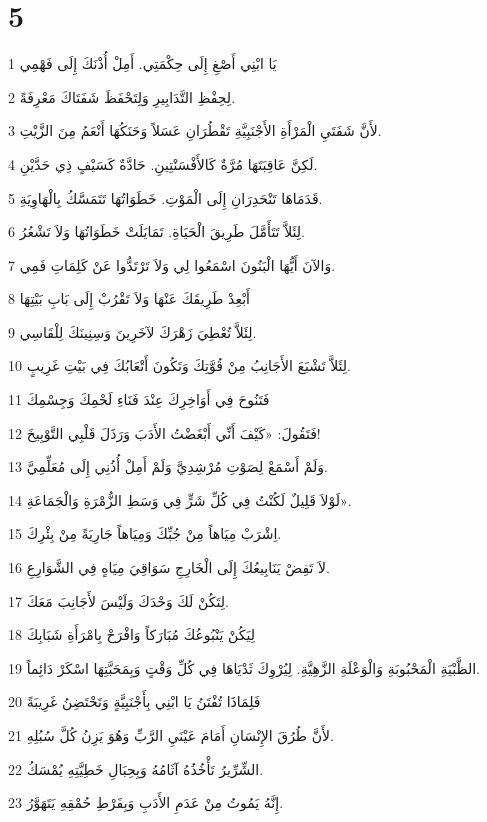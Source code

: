 \chapter{5}

\par 1 يَا ابْنِي أَصْغِ إِلَى حِكْمَتِي. أَمِلْ أُذْنَكَ إِلَى فَهْمِي
\par 2 لِحِفْظِ التَّدَابِيرِ وَلِتَحْفَظَ شَفَتَاكَ مَعْرِفَةً.
\par 3 لأَنَّ شَفَتَيِ الْمَرْأَةِ الأَجْنَبِيَّةِ تَقْطُرَانِ عَسَلاً وَحَنَكُهَا أَنْعَمُ مِنَ الزَّيْتِ.
\par 4 لَكِنَّ عَاقِبَتَهَا مُرَّةٌ كَالأَفْسَنْتِينِ. حَادَّةٌ كَسَيْفٍ ذِي حَدَّيْنِ.
\par 5 قَدَمَاهَا تَنْحَدِرَانِ إِلَى الْمَوْتِ. خَطَوَاتُهَا تَتَمَسَّكُ بِالْهَاوِيَةِ.
\par 6 لِئَلاَّ تَتَأَمَّلَ طَرِيقَ الْحَيَاةِ. تَمَايَلَتْ خَطَوَاتُهَا وَلاَ تَشْعُرُ.
\par 7 وَالآنَ أَيُّهَا الْبَنُونَ اسْمَعُوا لِي وَلاَ تَرْتَدُّوا عَنْ كَلِمَاتِ فَمِي.
\par 8 أَبْعِدْ طَرِيقَكَ عَنْهَا وَلاَ تَقْرُبْ إِلَى بَابِ بَيْتِهَا
\par 9 لِئَلاَّ تُعْطِيَ زَهْرَكَ لآخَرِينَ وَسِنِينَكَ لِلْقَاسِي.
\par 10 لِئَلاَّ تَشْبَعَ الأَجَانِبُ مِنْ قُوَّتِكَ وَتَكُونَ أَتْعَابُكَ فِي بَيْتِ غَرِيبٍ.
\par 11 فَتَنُوحَ فِي أَوَاخِرِكَ عِنْدَ فَنَاءِ لَحْمِكَ وَجِسْمِكَ
\par 12 فَتَقُولَ: «كَيْفَ أَنِّي أَبْغَضْتُ الأَدَبَ وَرَذَلَ قَلْبِي التَّوْبِيخَ!
\par 13 وَلَمْ أَسْمَعْ لِصَوْتِ مُرْشِدِيَّ وَلَمْ أَمِلْ أُذُنِي إِلَى مُعَلِّمِيَّ.
\par 14 لَوْلاَ قَلِيلٌ لَكُنْتُ فِي كُلِّ شَرٍّ فِي وَسَطِ الزُّمْرَةِ وَالْجَمَاعَةِ».
\par 15 اِشْرَبْ مِيَاهاً مِنْ جُبِّكَ وَمِيَاهاً جَارِيَةً مِنْ بِئْرِكَ.
\par 16 لاَ تَفِضْ يَنَابِيعُكَ إِلَى الْخَارِجِ سَوَاقِيَ مِيَاهٍ فِي الشَّوَارِعِ.
\par 17 لِتَكُنْ لَكَ وَحْدَكَ وَلَيْسَ لأَجَانِبَ مَعَكَ.
\par 18 لِيَكُنْ يَنْبُوعُكَ مُبَارَكاً وَافْرَحْ بِامْرَأَةِ شَبَابِكَ
\par 19 الظَّبْيَةِ الْمَحْبُوبَةِ وَالْوَعْلَةِ الزَّهِيَّةِ. لِيُرْوِكَ ثَدْيَاهَا فِي كُلِّ وَقْتٍ وَبِمَحَبَّتِهَا اسْكَرْ دَائِماً.
\par 20 فَلِمَاذَا تُفْتَنُ يَا ابْنِي بِأَجْنَبِيَّةٍ وَتَحْتَضِنُ غَرِيبَةً
\par 21 لأَنَّ طُرُقَ الإِنْسَانِ أَمَامَ عَيْنَيِ الرَّبِّ وَهُوَ يَزِنُ كُلَّ سُبُلِهِ.
\par 22 الشِّرِّيرُ تَأْخُذُهُ آثَامُهُ وَبِحِبَالِ خَطِيَّتِهِ يُمْسَكُ.
\par 23 إِنَّهُ يَمُوتُ مِنْ عَدَمِ الأَدَبِ وَبِفَرْطِ حُمْقِهِ يَتَهَوَّرُ.

